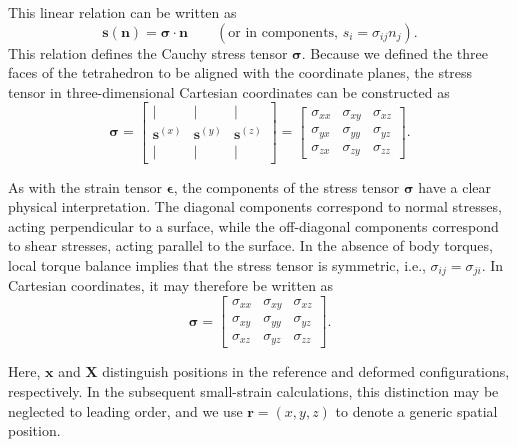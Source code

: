 This linear relation can be written as
\begin{equation}
    \bm{s}(\bm{n}) = \bm{\sigma}\cdot\bm{n} \qquad (\textrm{or in components, } s_i = \sigma_{ij} n_j).
\end{equation}
This relation defines the Cauchy stress tensor $\bm{\sigma}$. Because we defined the three faces of the tetrahedron to be aligned with the coordinate planes, the stress tensor in three-dimensional Cartesian coordinates can be constructed as
\[
    \bm{\sigma} = 
    \begin{bmatrix}
    | & | & | \\
    \bm{s}^{(x)} & \bm{s}^{(y)} & \bm{s}^{(z)} \\
    | & | & |
    \end{bmatrix}
    = 
    \begin{bmatrix}
        \sigma_{xx} & \sigma_{xy} & \sigma_{xz} \\
        \sigma_{yx} & \sigma_{yy} & \sigma_{yz} \\
        \sigma_{zx} & \sigma_{zy} & \sigma_{zz}
    \end{bmatrix}.
\]

As with the strain tensor $\bm{\epsilon}$, the components of the stress tensor $\bm{\sigma}$ have a clear physical interpretation. The diagonal components correspond to normal stresses, acting perpendicular to a surface, while the off-diagonal components correspond to shear stresses, acting parallel to the surface. In the absence of body torques, local torque balance implies that the stress tensor is symmetric, i.e., $\sigma_{ij} = \sigma_{ji}$.
In Cartesian coordinates, it may therefore be written as
\[
    \bm{\sigma} =
    \begin{bmatrix}
        \sigma_{xx} & \sigma_{xy} & \sigma_{xz} \\
        \sigma_{xy} & \sigma_{yy} & \sigma_{yz} \\
        \sigma_{xz} & \sigma_{yz} & \sigma_{zz}
    \end{bmatrix}.
\]

Here, $\bm{x}$ and $\bm{X}$ distinguish positions in the reference and deformed configurations, respectively. In the subsequent small-strain calculations, this distinction may be neglected to leading order, and we use $\bm{r}=(x,y,z)$ to denote a generic spatial position.

